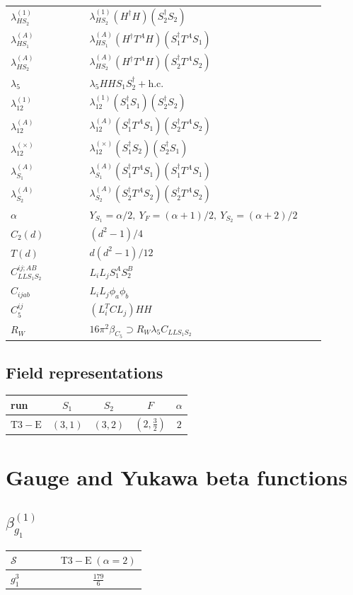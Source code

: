 \documentclass[9pt]{article}
\begin{document}
\begin{longtable}{@{}p{0.23\linewidth}p{0.69\linewidth}@{}}
$\lambda_{HS_2}^{(1)}$ & $\lambda_{HS_2}^{(1)}(H^\dagger H)(S_2^\dagger S_2)$ \\
$\lambda_{HS_1}^{(A)}$ & $\lambda_{HS_1}^{(A)}(H^\dagger T^AH)(S_1^\dagger T^AS_1)$ \\
$\lambda_{HS_2}^{(A)}$ & $\lambda_{HS_2}^{(A)}(H^\dagger T^AH)(S_2^\dagger T^AS_2)$ \\
$\lambda_5$ & $\lambda_5HHS_1S_2^\dagger+\mathrm{h.c.}$ \\
$\lambda_{12}^{(1)}$ & $\lambda_{12}^{(1)}(S_1^\dagger S_1)(S_2^\dagger S_2)$ \\
$\lambda_{12}^{(A)}$ & $\lambda_{12}^{(A)}(S_1^\dagger T^AS_1)(S_2^\dagger T^AS_2)$ \\
$\lambda_{12}^{(\times)}$ & $\lambda_{12}^{(\times)}(S_1^\dagger S_2)(S_2^\dagger S_1)$ \\
$\lambda_{S_1}^{(A)}$ & $\lambda_{S_1}^{(A)}(S_1^\dagger T^A S_1)(S_1^\dagger T^A S_1)$ \\
$\lambda_{S_2}^{(A)}$ & $\lambda_{S_2}^{(A)}(S_2^\dagger T^A S_2)(S_2^\dagger T^A S_2)$ \\
$\alpha$ & $Y_{S_1}=\alpha/2,\ Y_F=(\alpha+1)/2,\ Y_{S_2}=(\alpha+2)/2$ \\
$C_2(d)$ & $(d^2-1)/4$ \\
$T(d)$ & $d(d^2-1)/12$ \\
$C_{LLS_1S_2}^{ij;AB}$ & $L_iL_jS_1^AS_2^B$ \\
$C_{ijab}$ & $L_iL_j\phi_a\phi_b$ \\
$C_5^{ij}$ & $(L_i^TCL_j)HH$ \\
$R_W$ & $16\pi^2\beta_{C_5}\supset R_W\lambda_5C_{LLS_1S_2}$ \\
\bottomrule
\end{longtable}
\subsection*{Field representations}
\begin{longtable}{@{}lcccc@{}}
\toprule
run & $S_1$ & $S_2$ & $F$ & $\alpha$ \\
\midrule
$\mathrm{T3-E}$ & $(3,1)$ & $(3,2)$ & $(2,\frac{3}{2})$ & $2$ \\
\bottomrule
\end{longtable}
\section*{Gauge and Yukawa beta functions}
\subsection*{$ \beta_{g_1}^{(1)} $}
\begin{longtable}{@{}p{0.38\linewidth}c@{}}
\toprule
$\mathcal{S}$ & $ \mathrm{T3-E}\;(\alpha=2) $ \\
\midrule
$ g_1^3 $ & $ \frac{179}{6} $ \\
\bottomrule
\end{longtable}
\end{document}
